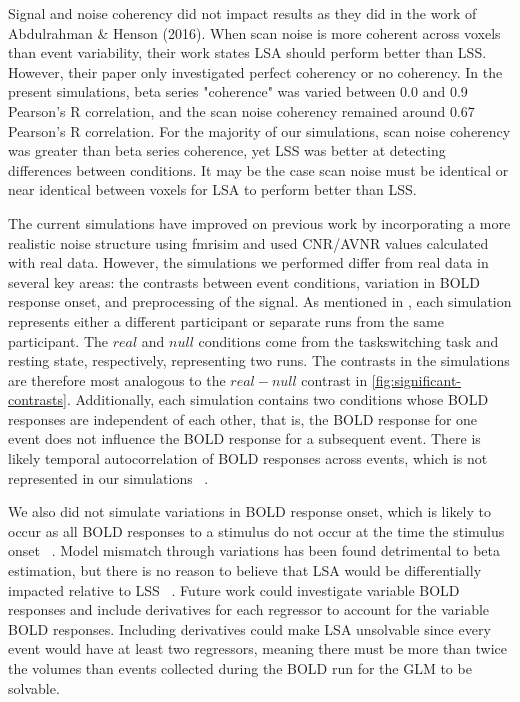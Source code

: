 \documentclass[10pt,letterpaper]{article}
\begin{document}
Signal and noise coherency did not impact results as they did in the work of Abdulrahman \& Henson (2016)\cite{Abdulrahman2016}.
When scan noise is more coherent across voxels than event variability,
their work states LSA should perform better than LSS.
However, their paper only investigated perfect coherency or no coherency.
In the present simulations, beta series "coherence" was varied between 0.0 and 0.9 Pearson's R correlation,
and the scan noise coherency remained around 0.67 Pearson's R correlation.
For the majority of our simulations, scan noise coherency was greater than beta series
coherence, yet LSS was better at detecting differences between conditions.
It may be the case scan noise must be identical or near identical between voxels
for LSA to perform better than LSS.

The current simulations have improved on previous work by incorporating a more
realistic noise structure using fmrisim and used CNR/AVNR values calculated with real data.
However, the simulations we performed differ from real data in several key areas: the contrasts between event conditions,
variation in BOLD response onset, and preprocessing of the signal.
As mentioned in , each simulation represents
either a different participant or separate runs from the same participant.
The $real$ and $null$ conditions come from the taskswitching task and resting state,
respectively, representing two runs.
The contrasts in the simulations are therefore most analogous to the $real - null$
contrast in \ref{fig:significant-contrasts}.
Additionally, each simulation contains two conditions whose BOLD responses
are independent of each other, that is, the BOLD response for one event
does not influence the BOLD response for a subsequent event.
There is likely temporal autocorrelation of BOLD responses across events,
which is not represented in our simulations ~\cite{Abdulrahman2016}.

We also did not simulate variations in BOLD response onset, which is likely to occur
as all BOLD responses to a stimulus do not occur at the time the stimulus onset ~\cite{DEsposito2003}.
Model mismatch through variations has been found detrimental to beta estimation, 
but there is no reason to believe that LSA would be differentially impacted relative to LSS ~\cite{Turner2012a}.
Future work could investigate variable BOLD responses and include derivatives for each regressor to account for
the variable BOLD responses.
Including derivatives could make LSA unsolvable since every event would have at least two regressors, meaning
there must be more than twice the volumes than events collected during the BOLD run
for the GLM to be solvable.
\end{document}
